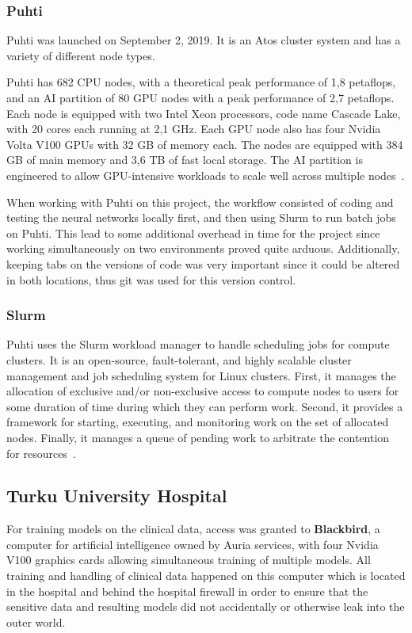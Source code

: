 \subsubsection{Puhti}\label{Puhti}
Puhti was launched on September 2, 2019.
It is an Atos cluster system and has a variety of different node types.

Puhti has 682 CPU nodes, with a theoretical peak performance of 1,8 petaflops, and an AI partition of 80 GPU nodes with a peak performance of 2,7 petaflops.
Each node is equipped with two Intel Xeon processors, code name Cascade Lake, with 20 cores each running at 2,1 GHz.
Each GPU node also has four Nvidia Volta V100 GPUs with 32 GB of memory each.
The nodes are equipped with 384 GB of main memory and 3,6 TB of fast local storage.
The AI partition is engineered to allow GPU-intensive workloads to scale well across multiple nodes~\cite{zotero-178}.

When working with Puhti on this project, the workflow consisted of coding and testing the neural networks locally first, and then using Slurm to run batch jobs on Puhti.
This lead to some additional overhead in time for the project since working simultaneously on two environments proved quite arduous.
Additionally, keeping tabs on the versions of code was very important since it could be altered in both locations, thus git \cite{zotero-186} was used for this version control.

\subsubsection{Slurm}\label{Slurm}
Puhti uses the Slurm workload manager \cite{zotero-174} to handle scheduling jobs for compute clusters.
It is an open-source, fault-tolerant, and highly scalable cluster management and job scheduling system for Linux clusters.
First, it manages the allocation of exclusive and/or non-exclusive access to compute nodes to users for some duration of time during which they can perform work.
Second, it provides a framework for starting, executing, and monitoring work on the set of allocated nodes.
Finally, it manages a queue of pending work to arbitrate the contention for resources~\cite{zotero-176}.


\subsection{Turku University Hospital} \label{Turku University Hospital}
For training models on the clinical data, access was granted to \textbf{Blackbird}, a computer for artificial intelligence owned by Auria services, with four Nvidia V100 graphics cards allowing simultaneous training of multiple models.
All training and handling of clinical data happened on this computer which is located in the hospital and behind the hospital firewall in order to ensure that the sensitive data and resulting models did not accidentally or otherwise leak into the outer world.


